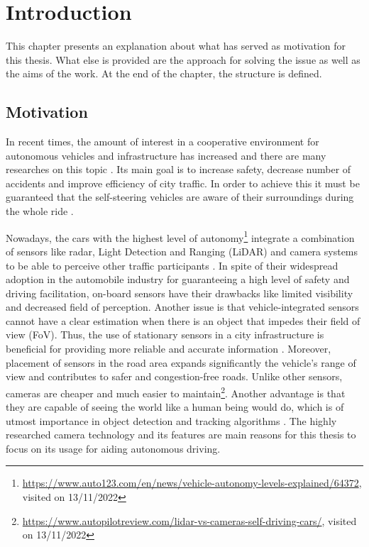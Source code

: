 \chapter{Introduction}
\label{introduction}
This chapter presents an explanation about what has served as motivation for this thesis. What else is provided are the approach for solving the issue as well as the aims of the work. At the end of the chapter, the structure is defined.

\section{Motivation}
In recent times, the amount of interest in a cooperative environment for autonomous vehicles and infrastructure has increased and there are many researches on this topic \cite{ cvis_article_one, cvis_article_two}. Its main goal is to increase safety, decrease number of accidents and improve efficiency of city traffic. In order to achieve this it must be guaranteed that the self-steering vehicles are aware of their surroundings during the whole ride \cite{onboard_sensors}.

Nowadays, the cars with the highest level of autonomy\footnote{\url{https://www.auto123.com/en/news/vehicle-autonomy-levels-explained/64372}, visited on 13/11/2022} integrate a combination of sensors like radar, Light Detection and Ranging (LiDAR) and camera systems to be able to perceive other traffic participants \cite{autonomous_cars_sensors}. In spite of their widespread adoption in the automobile industry for guaranteeing a high level of safety and driving facilitation, on-board sensors have their drawbacks like limited visibility and decreased field of perception. Another issue is that vehicle-integrated sensors cannot have a clear estimation when there is an object that impedes their field of view (FoV). Thus, the use of stationary sensors in a city infrastructure is beneficial for providing more reliable and accurate information \cite{roadside_lidar}. Moreover, placement of sensors in the road area expands significantly the vehicle's range of view and contributes to safer and congestion-free roads. Unlike other sensors, cameras are cheaper and much easier to maintain\footnote{\url{https://www.autopilotreview.com/lidar-vs-cameras-self-driving-cars/}, visited on 13/11/2022}. Another advantage is that they are capable of seeing the world like a human being would do, which is of utmost importance in object detection and tracking algorithms \cite{camera_object_detection}. The highly researched camera technology and its features are main reasons for this thesis to focus on its usage for aiding autonomous driving.

